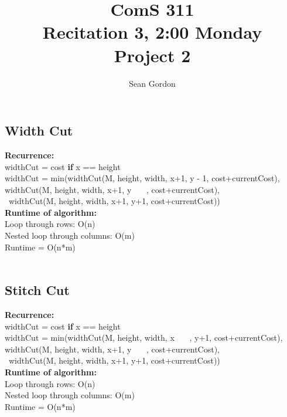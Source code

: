 \documentclass[12pt]{article}
\title{ComS 311\\Recitation 3, 2:00 Monday\\Project 2}
\author{Sean Gordon}
\begin{document}
\maketitle

\pagebreak 

\subsection*{Width Cut}
\noindent \textbf{Recurrence:} \\
widthCut = cost \textbf{if} x == height\\
widthCut = min(widthCut(M, height, width, x+1, y - 1, cost+currentCost),\\
\indent \indent \indent \indent \indent widthCut(M, height, width, x+1, y \ \ \ , cost+currentCost),\\
\indent \indent \indent \indent \indent \ widthCut(M, height, width, x+1, y+1, cost+currentCost))\\

\noindent \textbf{Runtime of algorithm:} \\
Loop through rows: O(n)\\
Nested loop through columns: O(m)\\
Runtime = O(n*m)\\


\hrulefill\\


\subsection*{Stitch Cut}
\noindent \textbf{Recurrence:} \\
widthCut = cost \textbf{if} x == height\\
widthCut = min(widthCut(M, height, width, x \ \ \ , y+1, cost+currentCost),\\
\indent \indent \indent \indent \indent widthCut(M, height, width, x+1, y \ \ \ , cost+currentCost),\\
\indent \indent \indent \indent \indent \ widthCut(M, height, width, x+1, y+1, cost+currentCost))\\

\noindent \textbf{Runtime of algorithm:} \\
Loop through rows: O(n)\\
Nested loop through columns: O(m)\\
Runtime = O(n*m)\\
\end{document}
